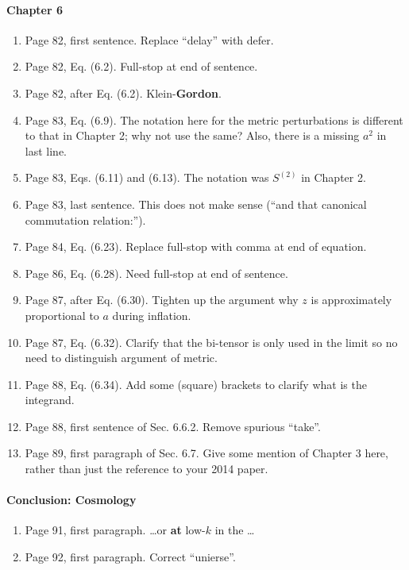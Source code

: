 \documentclass[11pt]{article}
\begin{document}
\paragraph{Chapter 6}
\begin{enumerate}
\item Page 82, first sentence. Replace ``delay'' with defer.
\item Page 82, Eq. (6.2). Full-stop at end of sentence.
\item Page 82, after Eq. (6.2). Klein-\textbf{Gordon}.
\item Page 83, Eq. (6.9). The notation here for the metric
  perturbations is different to that in
  Chapter 2; why not use the same? Also, there is a missing $a^2$ in
  last line.
\item Page 83, Eqs. (6.11) and (6.13). The notation was $S^{(2)}$ in
  Chapter 2.
\item Page 83, last sentence. This does not make sense (``and that
  canonical commutation relation:'').
\item Page 84, Eq. (6.23). Replace full-stop with comma at end of
  equation.
\item Page 86, Eq. (6.28). Need full-stop at end of sentence.
\item Page 87, after Eq. (6.30). Tighten up the argument why $z$ is
  approximately proportional to $a$ during inflation.
\item Page 87, Eq. (6.32). Clarify that the bi-tensor is only used in
  the limit so no need to distinguish argument of metric.
\item Page 88, Eq. (6.34). Add some (square) brackets to clarify what
  is the integrand.
\item Page 88,  first sentence of Sec. 6.6.2. Remove spurious
  ``take''.
\item Page 89, first paragraph of Sec. 6.7. Give some mention of
  Chapter 3 here, rather than just the reference to your 2014 paper. 
\end{enumerate}

\paragraph{Conclusion: Cosmology}
\begin{enumerate}
\item Page 91, first paragraph. \ldots or \textbf{at} low-$k$ in the
  \ldots
\item Page 92, first paragraph. Correct ``unierse''.
\end{enumerate}
\end{document}
